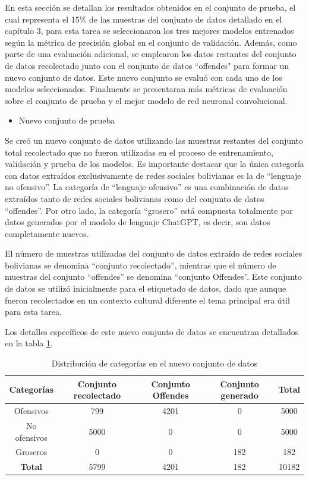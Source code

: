 En esta sección se detallan los resultados obtenidos en el conjunto de prueba, el cual representa el 15\% de las muestras del conjunto de datos detallado en el capítulo 3, para esta tarea se seleccionaron los tres mejores modelos entrenados según la métrica de precisión global en el conjunto de validación. Además, como parte de una evaluación adicional, se emplearon los datos restantes del conjunto de datos recolectado junto con el conjunto de datos “offendes" para formar un nuevo conjunto de datos. Este nuevo conjunto se evaluó con cada uno de los modelos seleccionados. Finalmente se presentaran más métricas de evaluación sobre el conjunto de prueba y el mejor modelo de red neuronal convolucional.

\begin{itemize}
\item Nuevo conjunto de prueba
\end{itemize}
Se creó un nuevo conjunto de datos utilizando las muestras restantes del conjunto total recolectado que no fueron utilizadas en el proceso de entrenamiento, validación y prueba de los modelos. Es importante destacar que la única categoría con datos extraídos exclusivamente de redes sociales bolivianas es la de ``lenguaje no ofensivo''. La categoría de ``lenguaje ofensivo'' es una combinación de datos extraídos tanto de redes sociales bolivianas como del conjunto de datos ``offendes''. Por otro lado, la categoría ``grosero'' está compuesta totalmente por datos generados por el modelo de lenguaje ChatGPT, es decir, son datos completamente nuevos.

El número de muestras utilizadas del conjunto de datos extraído de redes sociales bolivianas se denomina ``conjunto recolectado'', mientras que el número de muestras del conjunto ``offendes'' se denomina ``conjunto Offendes''. Este conjunto de datos se utilizó inicialmente para el etiquetado de datos, dado que aunque fueron recolectados en un contexto cultural diferente el tema principal era útil para esta tarea.

Los detalles específicos de este nuevo conjunto de datos se encuentran detallados en la tabla \ref{tbl:categorias}.

\begin{table}[!ht]
	\centering
	\begin{tabular}{|c|c|c|c|c|}
		\hline
		\textbf{Categorías} & \textbf{Conjunto recolectado} & \textbf{Conjunto Offendes} & \textbf{Conjunto generado} & \textbf{Total} \\ \hline
		Ofensivos & 799 & 4201 & 0 & 5000 \\ \hline
		No ofensivos & 5000 & 0 & 0 & 5000 \\ \hline
		Groseros & 0 & 0 & 182 & 182 \\ \hline
		\textbf{Total} & 5799 & 4201 & 182 & 10182 \\ \hline
	\end{tabular}
	\caption{Distribución de categorías en el nuevo conjunto de datos}
	\label{tbl:categorias}
\end{table}

